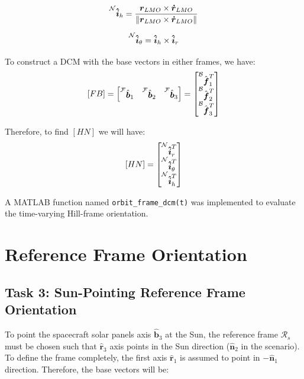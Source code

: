 \documentclass[12pt,a4paper]{report}
\begin{document}
	\[
	\prescript{\mathcal{N}}{}{\boldsymbol{\hat{i}}_h} = \frac{\boldsymbol{r}_{LMO} \times \boldsymbol{\dot{r}}_{LMO}}{\|\boldsymbol{r}_{LMO} \times \boldsymbol{\dot{r}}_{LMO}\|}
	\]
	
	\[
	\prescript{\mathcal{N}}{}{\boldsymbol{\hat{i}}_\theta} = \boldsymbol{\hat{i}}_h \times \boldsymbol{\hat{i}}_r
	\]
	
	To construct a DCM with the base vectors in either frames, we have:
	$$[FB] = 
	\begin{bmatrix}
		\prescript{\mathcal{F}}{}{\hat{\boldsymbol{b}}_1} & \prescript{\mathcal{F}}{}{\hat{\boldsymbol{b}}_2} & \prescript{\mathcal{F}}{}{\hat{\boldsymbol{b}}_3}
	\end{bmatrix} =
	\begin{bmatrix}
		\prescript{\mathcal{B}}{}{\hat{\boldsymbol{f}}_1 ^ T} \\
		\prescript{\mathcal{B}}{}{\hat{\boldsymbol{f}}_2 ^ T} \\
		\prescript{\mathcal{B}}{}{\hat{\boldsymbol{f}}_3 ^ T}
	\end{bmatrix}	$$
	
	Therefore, to find $[HN]$ we will have:
	$$[HN] = 
	\begin{bmatrix}
		\prescript{\mathcal{N}}{}{\boldsymbol{\hat{i}}_r ^ T} \\
		\prescript{\mathcal{N}}{}{\boldsymbol{\hat{i}}_\theta ^ T} \\
		\prescript{\mathcal{N}}{}{\boldsymbol{\hat{i}}_h ^ T}
	\end{bmatrix}$$
	
	A MATLAB function named \texttt{orbit\_frame\_dcm(t)} was implemented to evaluate the time-varying Hill-frame orientation.

	\section{Reference Frame Orientation}
	
	\subsection{Task 3: Sun-Pointing Reference Frame Orientation}
	
	To point the spacecraft solar panels axis $\boldsymbol{\hat{b}}_3$ at the Sun, the reference frame $\mathcal{R}_s$ must be chosen such that $\boldsymbol{\hat{r}}_3$ axis points in the Sun direction ($\boldsymbol{\hat{n}}_2$ in the scenario). To define the frame completely, the first axis $\boldsymbol{\hat{r}}_1$ is assumed to point in $-\boldsymbol{\hat{n}}_1$ direction. Therefore, the base vectors will be:
	
\end{document}
